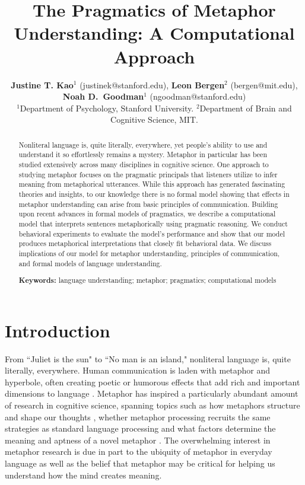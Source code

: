 \documentclass[10pt,letterpaper]{article}
\title{The Pragmatics of Metaphor Understanding: A Computational Approach}
\author{{\large {\bf Justine T. Kao$^1$} (justinek@stanford.edu)}, {\large {\bf Leon Bergen$^2$} (bergen@mit.edu)}, {\large {\bf Noah D.~Goodman$^1$} (ngoodman@stanford.edu)}\\
  $^1$Department of Psychology, Stanford University. $^2$Department of Brain and Cognitive Science, MIT. }
\begin{document}
\maketitle
\begin{abstract}
Nonliteral language is, quite literally, everywhere, yet people's ability to use and understand it so effortlessly remains a mystery. Metaphor in particular has been studied extensively across many disciplines in cognitive science. One approach to studying metaphor focuses on the pragmatic principals that listeners utilize to infer meaning from metaphorical utterances. While this approach has generated fascinating theories and insights, to our knowledge there is no formal model showing that effects in metaphor understanding can arise from basic principles of communication. Building upon recent advances in formal models of pragmatics, we describe a computational model that interprets sentences metaphorically using pragmatic reasoning. We conduct behavioral experiments to evaluate the model's performance and show that our model produces metaphorical interpretations that closely fit behavioral data. We discuss implications of our model for metaphor understanding, principles of communication, and formal models of language understanding.

\textbf{Keywords:} 
language understanding; metaphor; pragmatics; computational models
\end{abstract}


\section{Introduction}
From ``Juliet is the sun" to ``No man is an island," nonliteral language is, quite literally, everywhere. Human communication is laden with metaphor and hyperbole, often creating poetic or humorous effects that add rich and important dimensions to language \cite{glucksberg2001understanding, pilkington2000poetic, lakoff2009more, roberts1994people, bergen2003cognitive}. Metaphor has inspired a particularly abundant amount of research in cognitive science, spanning topics such as how metaphors structure and shape our thoughts \cite{ortony1993metaphor, lakoff1993contemporary, thibodeau2011metaphors}, whether metaphor processing recruits the same strategies as standard language processing \cite{giora1997understanding, ortony1978interpreting, gibbs2002new, glucksberg1993metaphors} and what factors determine the meaning and aptness of a novel metaphor \cite{blasko1993effects, tourangeau1981aptness, kintsch2002metaphor}. The overwhelming interest in metaphor research is due in part to the ubiquity of metaphor in everyday language as well as the belief that metaphor may be critical for helping us understand how the mind creates meaning. 
\end{document}
